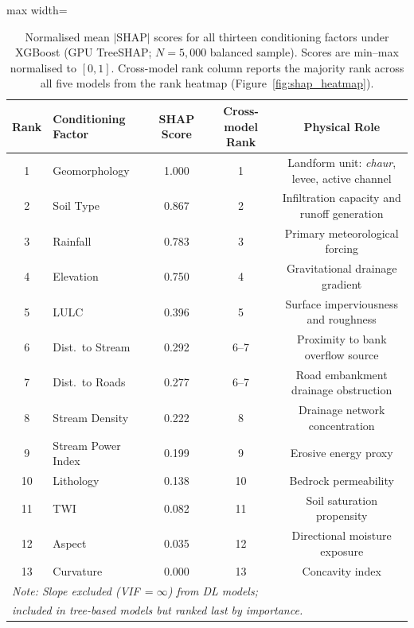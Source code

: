 \documentclass[12pt, a4paper]{article}
\begin{document}
\begin{table}[H]
\centering
\caption{Normalised mean $|\text{SHAP}|$ scores for all thirteen conditioning factors under XGBoost (GPU TreeSHAP; $N = 5{,}000$ balanced sample). Scores are min--max normalised to $[0,1]$. Cross-model rank column reports the majority rank across all five models from the rank heatmap (Figure~\ref{fig:shap_heatmap}).}
\label{tab:shap}
\begin{adjustbox}{max width=\linewidth}
\begin{tabular}{clccc}
\toprule
\textbf{Rank} & \textbf{Conditioning Factor} & \textbf{SHAP Score} & \textbf{Cross-model Rank} & \textbf{Physical Role} \\
\midrule
1  & Geomorphology      & 1.000 & 1 & Landform unit: \textit{chaur}, levee, active channel \\
2  & Soil Type          & 0.867 & 2 & Infiltration capacity and runoff generation \\
3  & Rainfall           & 0.783 & 3 & Primary meteorological forcing \\
4  & Elevation          & 0.750 & 4 & Gravitational drainage gradient \\
5  & LULC               & 0.396 & 5 & Surface imperviousness and roughness \\
6  & Dist.\ to Stream   & 0.292 & 6--7 & Proximity to bank overflow source \\
7  & Dist.\ to Roads    & 0.277 & 6--7 & Road embankment drainage obstruction \\
8  & Stream Density     & 0.222 & 8 & Drainage network concentration \\
9  & Stream Power Index & 0.199 & 9 & Erosive energy proxy \\
10 & Lithology          & 0.138 & 10 & Bedrock permeability \\
11 & TWI                & 0.082 & 11 & Soil saturation propensity \\
12 & Aspect             & 0.035 & 12 & Directional moisture exposure \\
13 & Curvature          & 0.000 & 13 & Concavity index \\
\midrule
\multicolumn{5}{l}{\textit{Note: Slope excluded (VIF\,$=\infty$) from DL models;}} \\
\multicolumn{5}{l}{\quad\textit{included in tree-based models but ranked last by importance.}} \\
\bottomrule
\end{tabular}
\end{adjustbox}
\end{table}
\end{document}

